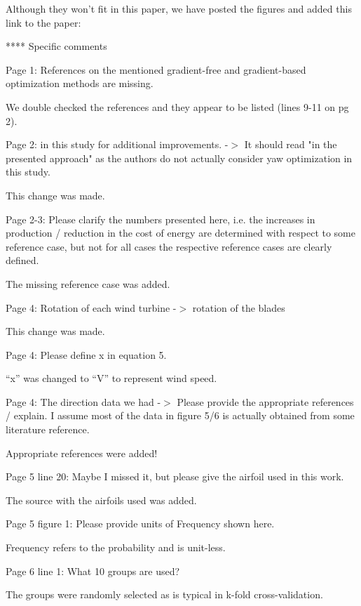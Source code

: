 \documentclass[12pt]{report}
\begin{document}
Although they won't fit in this paper, we have posted the figures and added this link to the paper: 


\bigskip \color{black}
**** Specific comments

\bigskip \color{black}
Page 1: References on the mentioned gradient-free and gradient-based optimization methods are missing.

\color{blue} We double checked the references and they appear to be listed (lines 9-11 on pg 2).

\bigskip \color{black}
Page 2: in this study for additional improvements. -$>$ It should read "in the presented approach" as the authors do not actually consider yaw optimization in this study.

\color{blue} This change was made.

\bigskip \color{black}
Page 2-3: Please clarify the numbers presented here, i.e. the increases in production / reduction in the cost of energy are determined with respect to some reference case, but not for all cases the respective reference cases are clearly defined.

\color{blue} The missing reference case was added.

\bigskip \color{black}
Page 4: Rotation of each wind turbine -$>$ rotation of the blades

\color{blue} This change was made.

\bigskip \color{black}
Page 4: Please define x in equation 5.

\color{blue} ``x'' was changed to ``V'' to represent wind speed.

\bigskip \color{black}
Page 4: The direction data we had -$>$ Please provide the appropriate references / explain. I assume most of the data in figure 5/6 is actually obtained from some literature reference.

\color{blue} Appropriate references were added!

\bigskip \color{black}
Page 5 line 20: Maybe I missed it, but please give the airfoil used in this work.

\color{blue} The source with the airfoils used was added.

\bigskip \color{black}
Page 5 figure 1: Please provide units of Frequency shown here.

\color{blue} Frequency refers to the probability and is unit-less.

\bigskip \color{black}
Page 6 line 1: What 10 groups are used?

\color{blue} The groups were randomly selected as is typical in k-fold cross-validation.
\end{document}
